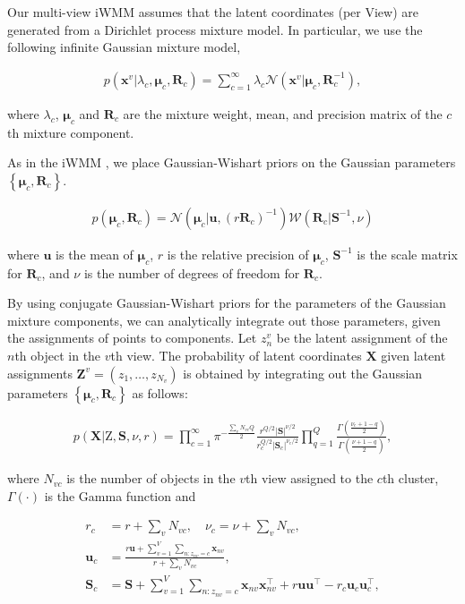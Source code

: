 \documentclass[]{article}
\newcommand{\gD}[2]{\mathcal{N}\left(#1,#2\right)}
\newcommand{\Z}{\boldsymbol{\mathrm{Z}}}
\newcommand{\Scluster}{\mathbf{S}}
\newcommand{\setZv}{\mathbf{Z}^{v}}
\newcommand{\setX}{\mathbf{X}}
\newcommand{\lambdac}{\lambda_c}
\newcommand{\muC}{\boldsymbol{\mu}_c}
\newcommand{\RC}{\mathbf{R}_c}
\begin{document}
Our multi-view iWMM assumes that the latent coordinates (per View) are generated from a Dirichlet process mixture model. In particular, we use the following infinite Gaussian mixture model,

\begin{align}
p(\mathbf{x}^{v}|\lambdac,\muC,\RC) = \sum_{c=1}^{\infty}\lambdac \gD{\mathbf{x}^{v}|\muC}{\RC^{-1}},
\end{align}

where $\lambdac$, $\muC$ and $\RC$ are the mixture weight, mean, and
precision matrix of the $c$th mixture component.

As in the iWMM \cite{IwaDuvGha2012warped}, we
place Gaussian-Wishart priors on the Gaussian parameters $\left\{\muC,\RC\right\}$.

\begin{align}
p\left(\muC,\RC\right) = \gD{\muC|\mathbf{u}}{(r\RC)^{-1}}\mathcal{W}\left(\RC|\mathbf{S}^{-1},\nu\right)
\end{align}

where $\mathbf{u}$ is the mean of $\muC$, $r$ is the relative precision of $\muC$, $\mathbf{S}^{-1}$ is the scale matrix for $\RC$, and $\nu$ is the number of degrees of freedom for $\RC$.


By using conjugate Gaussian-Wishart priors for the parameters
of the Gaussian mixture components, we can analytically
integrate out those parameters, given the assignments
of points to components. Let $z_n^{v}$ be the latent assignment
of the $n$th object in the $v$th view. The probability of latent coordinates $\mathbf{X}$ given latent assignments $\setZv = \left(z_1,\dots,z_{N_v}\right)$ is obtained by integrating out the Gaussian parameters $\left\{\muC,\RC\right\}$ as follows:


\begin{align}
p\left(\setX|\Z,\Scluster,\nu,r\right) = \prod_{c=1}^{\infty} \pi^{-\frac{\sum_v N_{vc}Q}{2}}\frac{r^{Q/2}|\Scluster|^{\nu/2}}{r_c^{Q/2}|\Scluster_c|^{\nu_c/2}}\prod_{q=1}^{Q}\frac{\Gamma\left(\frac{\nu_c + 1 -q}{2}\right)}{\Gamma\left(\frac{\nu + 1 -q}{2}\right)},
\end{align}

where $N_{vc}$ is the number of objects in the $v$th view assigned to the $c$th cluster, $\Gamma\left(\cdot\right)$ is the Gamma function and

\begin{align*}
r_c &= r + \sum_v N_{vc},\quad \nu_c = \nu + \sum_v N_{vc},\\
\mathbf{u}_c & = \frac{r\mathbf{u}+\sum_{v=1}^{V}\sum_{n:z_{nv} = c}\mathbf{x}_{nv}}{r+\sum_v N_{vc}},\\
\Scluster_c &= \Scluster + \sum_{v=1}^{V}\sum_{n:z_{nv} = c} \mathbf{x}_{nv}\mathbf{x}_{nv}^\top + r \mathbf{u}\mathbf{u}^\top - r_c \mathbf{u}_c\mathbf{u}_c^\top,
\end{align*}
\end{document}
